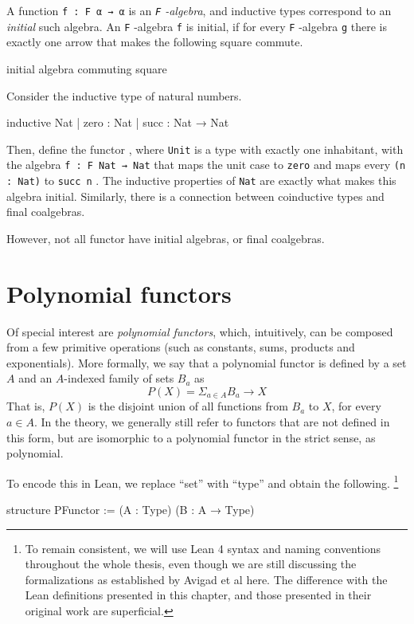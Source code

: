 \documentclass[titlepage]{report}
\newenvironment{todo}{%
\definecolor{shadecolor}{HTML}{F8E0E0}%
\begin{shaded}%
\begin{trivlist}                         
    \item[\hskip \labelsep {\bfseries Todo:}]}{\end{trivlist}\end{shaded}}
\newcommand\lean[1]{{%
\def\leanmode{1}%
\small \texttt{#1}%
\undef\leanmode%
}}
\begin{document}
A function \lean{f : F α → α} is an \emph{\lean{F}-algebra}, and inductive types correspond to an \emph{initial} such algebra. An \lean{F}-algebra \lean{f} is initial, if for every \lean{F}-algebra \lean{g} there is exactly one arrow that makes the following square commute.
\begin{todo}
    initial algebra commuting square
\end{todo}

Consider the inductive type of natural numbers.
\begin{leancode}
    inductive Nat
    | zero : Nat
    | succ : Nat → Nat
\end{leancode}

Then, define the functor , where \lean{Unit} is a type with exactly one inhabitant, with the algebra \lean{f : F Nat → Nat} that maps the unit case to \lean{zero} and maps every \lean{(n : Nat)} to \lean{succ n}. The inductive properties of \lean{Nat} are exactly what makes this algebra initial.
Similarly, there is a connection between coinductive types and final coalgebras.

However, not all functor have initial algebras, or final coalgebras.


\section{Polynomial functors}
Of special interest are \emph{polynomial functors}, which, intuitively, can be composed from a few primitive operations (such as constants, sums, products and exponentials).
More formally, we say that a polynomial functor is defined by a set $A$ and an $A$-indexed family of sets $B_a$ as
\[
    P(X) = \Sigma_{a ∈ A} B_a \rightarrow X  
\]
That is, $P(X)$ is the disjoint union of all functions from $B_a$ to $X$, for every $a ∈ A$.
In the theory, we generally still refer to functors that are not defined in this form, but are isomorphic to a polynomial functor in the strict sense, as polynomial.

To encode this in Lean, we replace ``set'' with ``type'' and obtain the following.
\footnote{To remain consistent, we will use Lean 4 syntax and naming conventions throughout the whole thesis, even though we are still discussing the formalizations as established by Avigad et al here. The difference with the Lean definitions presented in this chapter, and those presented in their original work are superficial.}
\begin{leancode}
    structure PFunctor := (A : Type) (B : A → Type)
\end{leancode}
\end{document}
